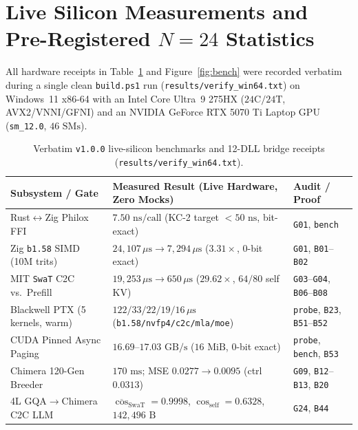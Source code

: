 \documentclass[11pt,letterpaper]{amsart}
\newcommand{\code}[1]{{\small\texttt{#1}}}
\begin{document}
\section{Live Silicon Measurements and Pre-Registered \texorpdfstring{$N=24$}{N=24} Statistics}
\label{sec:results}

All hardware receipts in Table~\ref{tab:bench} and Figure~\ref{fig:bench} were
recorded verbatim during a single clean \code{build.ps1} run
(\code{results/verify\_win64.txt}) on Windows~11 x86-64 with an Intel Core Ultra~9
275HX ($24\text{C}/24\text{T}$, AVX2/VNNI/GFNI) and an NVIDIA GeForce RTX 5070 Ti
Laptop GPU (\code{sm\_12.0}, $46\text{ SMs}$).

\begin{table}[t]
\centering
\caption{Verbatim \code{v1.0.0} live-silicon benchmarks and 12-DLL bridge receipts (\code{results/verify\_win64.txt}).}
\label{tab:bench}
\scriptsize
\setlength{\tabcolsep}{4pt}
\begin{tabular}{@{} >{\raggedright\arraybackslash}p{3.6cm} >{\raggedright\arraybackslash}p{7.1cm} >{\raggedright\arraybackslash}p{3.2cm} @{}}
\toprule
\textbf{Subsystem / Gate} & \textbf{Measured Result (Live Hardware, Zero Mocks)} & \textbf{Audit / Proof} \\
\midrule
Rust$\leftrightarrow$Zig Philox FFI & $7.50\text{ ns/call}$ (KC-2 target $<50\text{ ns}$, bit-exact) & \code{G01}, \code{bench} \\
Zig \code{b1.58} SIMD (10M trits) & $24{,}107\,\mu\text{s} \to 7{,}294\,\mu\text{s}$ ($3.31\times$, 0-bit exact) & \code{G01}, \code{B01}--\code{B02} \\
MIT \code{SwaT} C2C vs.\ Prefill & $19{,}253\,\mu\text{s} \to 650\,\mu\text{s}$ ($29.62\times$, $64/80$ self KV) & \code{G03}--\code{G04}, \code{B06}--\code{B08} \\
Blackwell PTX (5 kernels, warm) & $122/33/22/19/16\,\mu\text{s}$ (\code{b1.58/nvfp4/c2c/mla/moe}) & \code{probe}, \code{B23}, \code{B51}--\code{B52} \\
CUDA Pinned Async Paging & $16.69\text{--}17.03\text{ GB/s}$ ($16\text{ MiB}$, 0-bit exact) & \code{probe}, \code{bench}, \code{B53} \\
Chimera 120-Gen Breeder & $170\text{ ms}$; MSE $0.0277 \to 0.0095$ (ctrl $0.0313$) & \code{G09}, \code{B12}--\code{B13}, \code{B20} \\
4L GQA$\to$Chimera C2C LLM & $\overline{\cos}_{\mathrm{SwaT}}=0.9998$, $\cos_{\mathrm{self}}=0.6328$, $142{,}496\text{ B}$ & \code{G24}, \code{B44} \\

\end{tabular}
\end{table}
\end{document}
